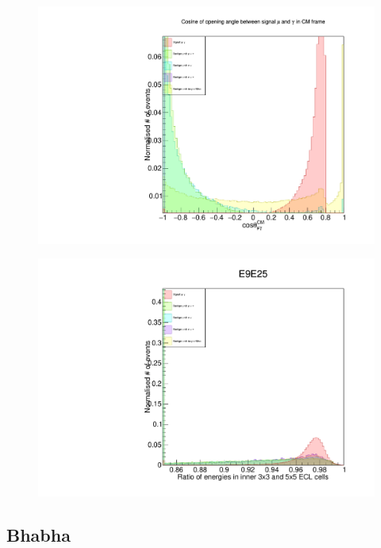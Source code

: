 \documentclass[12pt]{thesis}  %
\begin{document}
\begin{figure}[h]
\centering
\begin{minipage}{.5\textwidth}
  \centering
  \includegraphics[width=\linewidth]{images/taupair-muGammaOpeningCM.pdf}
  \label{fig:test1}
\end{minipage}%
\begin{minipage}{.5\textwidth}
  \centering
  \includegraphics[width=\linewidth]{images/taupair-e9e25.pdf}
  \label{fig:test2}
\end{minipage}
\end{figure}



\subsection{Bhabha}
\end{document}
